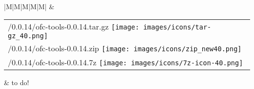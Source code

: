 \begin{tabular}{|M|M|M|M|M|}
& 
\begin{tabular}{l}
\BuildLinkWithSizeInKo{\IHTDIR/distrib/0.0.14/ofc-tools-0.0.14.tar.gz}
                  {\OHTDIR/0.0.14/ofc-tools-0.0.14.tar.gz}
                  {\texttt{[image: images/icons/tar-gz\_40.png]}}
\\ 
\BuildLinkWithSizeInKo{\IHTDIR/distrib/0.0.14/ofc-tools-0.0.14.zip}
                  {\OHTDIR/0.0.14/ofc-tools-0.0.14.zip}
                  {\texttt{[image: images/icons/zip\_new40.png]}} 
\\ 
\BuildLinkWithSizeInKo{\IHTDIR/distrib/0.0.14/ofc-tools-0.0.14.7z}
                  {\OHTDIR/0.0.14/ofc-tools-0.0.14.7z}
                  {\texttt{[image: images/icons/7z-icon-40.png]}}                   
\end{tabular}
&
to do!
\\ \hline
\end{tabular}





